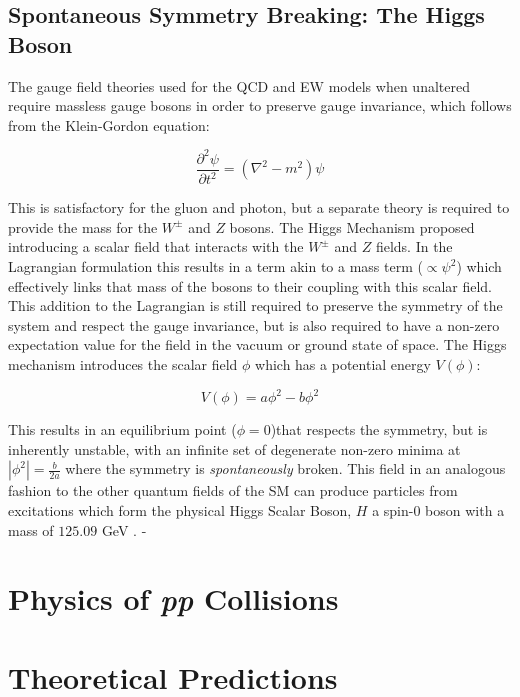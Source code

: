 		
		
	\subsection{Spontaneous Symmetry Breaking: The Higgs Boson}
	\label{t:symbreak}
	
	The gauge field theories used for the QCD and EW models when unaltered require massless gauge bosons in order to preserve gauge invariance, which follows from the Klein-Gordon equation:
	
	\begin{equation}
		\frac{\partial^2\psi}{\partial t^2} = (\nabla^2 - m^2)\psi
	\end{equation}
	
	 This is satisfactory for the gluon and photon, but a separate theory is required to provide the mass for the $W^\pm$ and $Z$ bosons. The Higgs Mechanism  proposed introducing a scalar field that interacts with the $W^\pm$ and $Z$ fields. In the Lagrangian formulation this results in a term akin to a mass term ($\propto\psi^2$) which effectively links that mass of the bosons to their coupling with this scalar field. This addition to the Lagrangian is still required to preserve the symmetry of the system and respect the gauge invariance, but is also required to have a non-zero expectation value for the field in the vacuum or ground state of space. The Higgs mechanism introduces the scalar field $\phi$ which has a potential energy $V(\phi)$: 
	 
	 \begin{equation}
		 V(\phi) = a\phi^2 - b\phi^2
	 \end{equation} 
		
	This results in an equilibrium point ($\phi=0$)that respects the symmetry, but is inherently unstable, with an infinite set of degenerate non-zero minima at $|\phi^2|=\frac{b}{2a}$ where the symmetry is \textit{spontaneously} broken. This field in an analogous fashion to the other quantum fields of the SM can produce particles from excitations which form the physical Higgs Scalar Boson, $H$ a spin-0 boson with a mass of $125.09$ GeV \cite{pdg}.
	-

\section{Physics of \textit{pp} Collisions}

\section{Theoretical Predictions}

